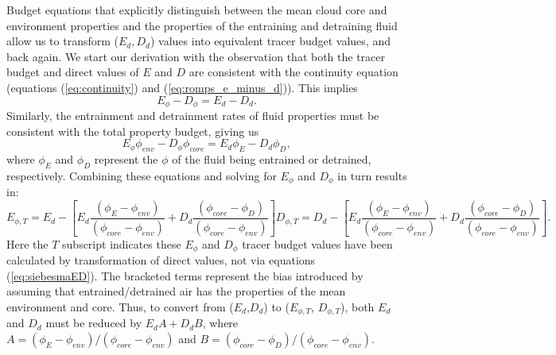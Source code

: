 \documentclass[12pt]{article}
\begin{document}
Budget equations that explicitly distinguish between the mean cloud 
core and environment properties and the properties of the entraining 
and detraining fluid allow us to transform ($E_d, D_d$) values into 
equivalent tracer budget values, and back again.  We start our derivation
with the observation that both the tracer budget and direct values of 
$E$ and $D$ are consistent with the continuity equation (equations 
(\ref{eq:continuity}) and (\ref{eq:romps_e_minus_d})).  This implies  
\begin{equation}
  E_{\phi} - D_{\phi} = E_d - D_d.
\end{equation}
Similarly, the entrainment and detrainment rates of fluid properties 
must be consistent with the total property budget, giving us
\begin{equation}
  E_{\phi} \phi_{env} - D_{\phi} \phi_{core} = E_d \phi_E - D_d \phi_D,
\end{equation}
where $\phi_E$ and $\phi_D$ represent the $\phi$ of the fluid being 
entrained or detrained, respectively. Combining these equations and 
solving for $E_{\phi}$ and $D_{\phi}$ in turn results in:
\begin{subequations}
  \label{eq:correctedED}
\begin{equation}
  \label{eq:corrected_entrainment}
    E_{\phi,T} = E_d 
             - \left[E_d\frac{(\phi_E - \phi_{env})}
                             {(\phi_{core} - \phi_{env})}
                   + D_d\frac{(\phi_{core} - \phi_D)}
                             {(\phi_{core} - \phi_{env})}\right]
\end{equation}
\begin{equation}
  \label{eq:corrected_detrainment}
    D_{\phi,T} = D_d
             - \left[E_d\frac{(\phi_E - \phi_{env})}
                             {(\phi_{core} - \phi_{env})}
                   + D_d\frac{(\phi_{core} - \phi_D)}
                             {(\phi_{core} - \phi_{env})}\right].
\end{equation}
\end{subequations}
Here the $T$ subscript indicates these $E_{\phi}$ and $D_{\phi}$ 
tracer budget values have been calculated by transformation of direct 
values, not via equations (\ref{eq:siebesmaED}).  The bracketed terms 
represent the bias introduced by assuming that entrained/detrained air 
has the properties of the mean environment and core.  Thus, to convert 
from ($E_d$,$D_d$) to ($E_{\phi,T}$, $D_{\phi,T}$), both $E_d$ and $D_d$ 
must be reduced by $E_d A + D_d B$, where 
$A = (\phi_E - \phi_{env})/(\phi_{core} - \phi_{env})$ and 
$B = (\phi_{core} - \phi_D)/(\phi_{core} - \phi_{env})$.  
\end{document}
